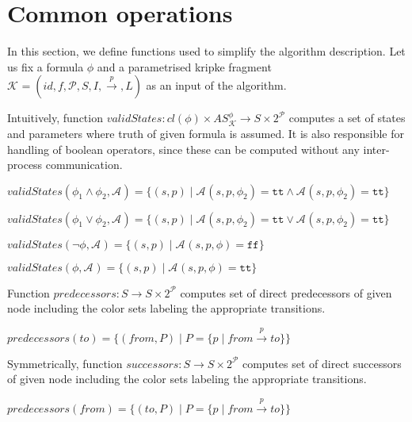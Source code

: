 \documentclass[12pt,oneside,draft]{fithesis2}
\newcommand{\as}[1][]{\ensuremath{\mathcal{A}_{#1}}}
\newcommand{\ASphi}{\ensuremath{AS_{\mathcal K}^\phi}}
\newcommand{\true}{\ensuremath{\texttt{tt}}}
\newcommand{\false}{\ensuremath{\texttt{ff}}}
\newcommand{\ks}[1][]{\ensuremath{\mathcal{K}_{#1}}}
\newcommand{\fullks}{\ensuremath{ \ks = (id, f, \params, S, I, \trans{p}, L) }}
\newcommand{\trans}[1]{\stackrel{#1}{\rightarrow}}
\newcommand{\params}{\mathcal{P}}
\begin{document}
    	\section{Common operations}
    		
    		In this section, we define functions used to simplify the algorithm description. Let us fix a formula $\phi$ and a parametrised kripke fragment $\fullks$ as an input of the algorithm.
			
			Intuitively, function $validStates : cl(\phi) \times \ASphi \rightarrow S \times 2^\mathcal{P} $ computes a set of states and parameters where truth of given formula is assumed. It is also responsible for handling of boolean operators, since these can be computed without any inter-process communication. 
			
			\begin{center}
				$validStates(\phi_1 \wedge \phi_2, \as) = \{ (s, p) \mid \as(s, p, \phi_2) = \true \wedge \as(s, p, \phi_2) = \true \} $
			\end{center}
			
			\begin{center}
				$validStates(\phi_1 \vee \phi_2, \as) = \{ (s, p) \mid \as(s, p, \phi_2) = \true \vee \as(s, p, \phi_2) = \true \} $
			\end{center}
			
			\begin{center}
				$validStates(\neg\phi, \as) = \{ (s, p) \mid \as(s, p, \phi) = \false \} $
			\end{center}
			
			\begin{center}
				$validStates(\phi, \as) = \{ (s, p) \mid \as(s, p, \phi) = \true \} $
			\end{center}
			
			Function $predecessors : S \rightarrow S \times 2^\mathcal{P} $ computes set of direct predecessors of given node including the color sets labeling the appropriate transitions.
			
			\begin{center}
				$predecessors(to) = \{ (from, P) \mid P = \{ p \mid from \trans{p} to \} \} $
			\end{center}
			
			Symmetrically, function $successors : S \rightarrow S \times 2^\mathcal{P} $ computes set of direct successors of given node including the color sets labeling the appropriate transitions.

			\begin{center}
				$predecessors(from) = \{ (to, P) \mid P = \{ p \mid from \trans{p} to \} \} $
			\end{center}		
\end{document}
